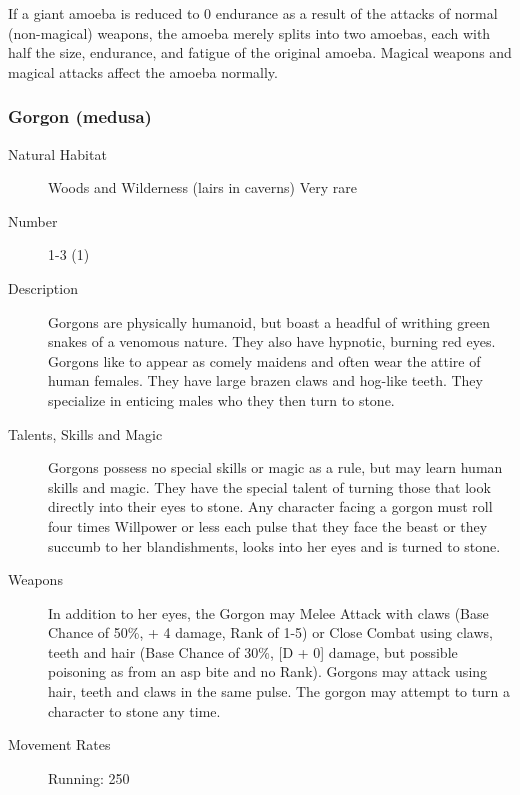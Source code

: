 \begin{multicols}{2}
\begin{description}
\setlength\itemsep{0pt}

\item[Comments] If a giant amoeba is reduced to 0 endurance as a result of
the attacks of normal (non-magical) weapons, the amoeba merely splits
into two amoebas, each with half the size, endurance, and fatigue of
the original amoeba. Magical weapons and magical attacks affect the
amoeba normally.

\end{description}

\subsubsection{Gorgon (medusa)}

\begin{description}
\item[Natural Habitat] Woods and Wilderness (lairs in caverns) Very rare 

\item[Number]  1-3 (1)

\item[Description] Gorgons are physically humanoid, but boast a headful of
writhing green snakes of a venomous nature. They also have hypnotic,
burning red eyes. Gorgons like to appear as comely maidens and often
wear the attire of human females.  They have large brazen claws and
hog-like teeth. They specialize in enticing males who they then turn
to stone.

\item[Talents, Skills and Magic] Gorgons possess no special skills or magic as a rule, but
may learn human skills and magic. They have the special talent of
turning those that look directly into their eyes to stone. Any
character facing a gorgon must roll four times Willpower or less each
pulse that they face the beast or they succumb to her blandishments,
looks into her eyes and is turned to stone.

\item[Weapons] In addition to her eyes, the Gorgon may Melee Attack with
claws (Base Chance of 50\%, + 4 damage, Rank of 1-5) or Close Combat
using claws, teeth and hair (Base Chance of 30\%, [D + 0] damage, but
possible poisoning as from an asp bite and no Rank). Gorgons may
attack using hair, teeth and claws in the same pulse. The gorgon may
attempt to turn a character to stone any time.


\item[Movement Rates] Running: 250


\end{description}
\end{multicols}
